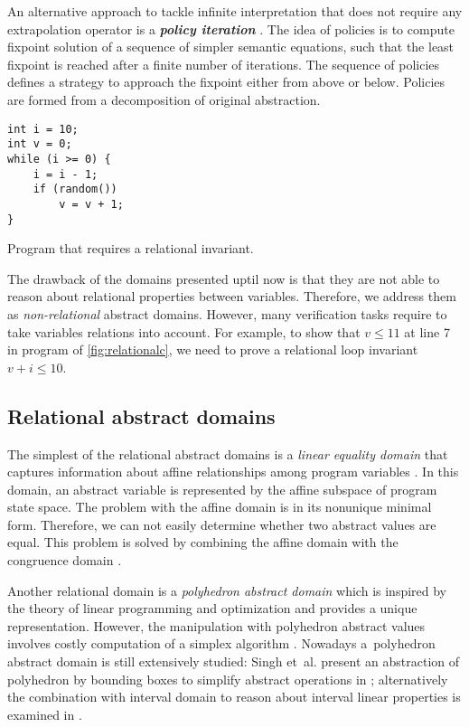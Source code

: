 An alternative approach to tackle infinite interpretation that does not require
any extrapolation operator is a \textbf{\emph{policy iteration}}
\cite{Costan2005, Gaubert2007, Gawlitza2007, Gawlitza2007b, Gawlitza2011}. The
idea of policies is to compute fixpoint solution of a sequence of simpler
semantic equations, such that the least fixpoint is reached after a finite
number of iterations.  The sequence of policies defines a strategy to approach
the fixpoint either from above or below. Policies are formed from a
decomposition of original abstraction.

\begin{marginfigure}
\begin{verbatim}
int i = 10;
int v = 0;
while (i >= 0) {
    i = i - 1;
    if (random())
        v = v + 1;
}
\end{verbatim}
    \caption{Program that requires a relational invariant.}
    \label{fig:relationalc}
\end{marginfigure}

The drawback of the domains presented uptil now is that they are not able to reason about
relational properties between variables. Therefore, we address them as
\emph{non-relational} abstract domains.  However, many verification tasks
require to take variables relations into account.  For example, to show that $v \leq 11$
at line 7 in program of \autoref{fig:relationalc}, we need to prove a
relational loop invariant $v + i
\leq 10$.


\subsection{Relational abstract domains}

The simplest of the relational abstract domains is a \emph{linear equality
domain} that captures information about affine relationships among program
variables \cite{Karr1976}. In this domain, an abstract variable is represented
by the affine subspace of program state space. The problem with the affine
domain is in its nonunique minimal form. Therefore, we can not easily determine
whether two abstract values are equal. This problem is solved by combining
the affine domain with the congruence domain \cite{Granger1991}.

Another relational domain is a \emph{polyhedron abstract domain} which is
inspired by the theory of linear programming and optimization \cite{Cousot1978, Venet2012}
and provides a unique representation. However, the manipulation with polyhedron
abstract values involves costly computation of a simplex algorithm
\cite{Schrijver1986}. Nowadays a~polyhedron abstract domain is still
extensively studied: Singh et~al. present an abstraction of polyhedron by
bounding boxes to simplify abstract operations in \cite{Singh2017};
alternatively the combination with interval domain to reason about interval
linear properties is examined in \cite{Chen2009}.

